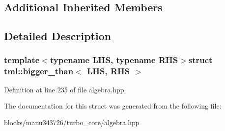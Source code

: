 \subsection*{Additional Inherited Members}


\subsection{Detailed Description}
\subsubsection*{template$<$typename L\+H\+S, typename R\+H\+S$>$struct tml\+::bigger\+\_\+than$<$ L\+H\+S, R\+H\+S $>$}



Definition at line 235 of file algebra.\+hpp.



The documentation for this struct was generated from the following file\+:\begin{DoxyCompactItemize}
\item 
blocks/manu343726/turbo\+\_\+core/algebra.\+hpp\end{DoxyCompactItemize}
